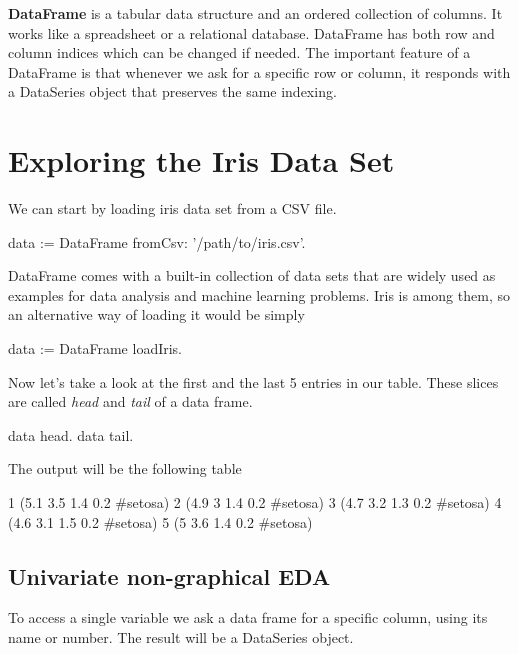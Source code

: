 \documentclass{article}
\begin{document}
\begin{multicols}{2}
\textbf{DataFrame} is a tabular data structure and an ordered collection of columns. It works like a spreadsheet or a relational database. DataFrame has both row and column indices which can be changed if needed. The important feature of a DataFrame is that whenever we ask for a specific row or column, it responds with a DataSeries object that preserves the same indexing.

\section{Exploring the Iris Data Set}
\label{sec:contribution}
%
%

We can start by loading iris data set from a CSV file.
\begin{code}{}
data := DataFrame fromCsv: '/path/to/iris.csv'.
\end{code}

DataFrame comes with a built-in collection of data sets that are widely used as examples for data analysis and machine learning problems. Iris is among them, so an alternative way of loading it would be simply

\begin{code}{}
data := DataFrame loadIris.
\end{code}

Now let's take a look at the first and the last 5 entries in our table. These slices are called \textit{head} and \textit{tail} of a data frame.

\begin{code}{}
data head.
data tail.
\end{code}

The output will be the following table
\begin{code}{}
1   (5.1 3.5 1.4 0.2 #setosa)
2	  (4.9 3 1.4 0.2 #setosa)
3	  (4.7 3.2 1.3 0.2 #setosa)
4	  (4.6 3.1 1.5 0.2 #setosa)
5	  (5 3.6 1.4 0.2 #setosa)

\end{code}

\subsection{Univariate non-graphical EDA}
To access a single variable we ask a data frame for a specific column, using its name or number. The result will be a DataSeries object.


\end{multicols}
\end{document}

